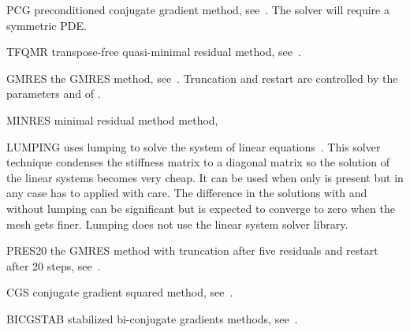 \begin{memberdesc}[SolverOptions]{PCG}
preconditioned conjugate gradient method, see~. The solver will require a symmetric PDE.
\end{memberdesc}

\begin{memberdesc}[SolverOptions]{TFQMR}
transpose-free quasi-minimal residual method, see~. \end{memberdesc}

\begin{memberdesc}[SolverOptions]{GMRES}
the GMRES method, see~. Truncation and restart are controlled by the parameters
 and  of .
\end{memberdesc}

\begin{memberdesc}[SolverOptions]{MINRES}
minimal residual method method,  \end{memberdesc}

\begin{memberdesc}[SolverOptions]{LUMPING}
uses lumping to solve the system of linear equations~. This solver technique
condenses the stiffness matrix to a diagonal matrix so the solution of the linear systems becomes very cheap. It can be used when
only  is present but in any case has to applied with care. The difference in the solutions with and without lumping can be significant
but is expected to converge to zero when the mesh gets finer.
Lumping does not use the linear system solver library.
\end{memberdesc}

\begin{memberdesc}[SolverOptions]{PRES20}
the GMRES method with truncation after five residuals and
restart after 20 steps, see~.
\end{memberdesc}

\begin{memberdesc}[SolverOptions]{CGS}
conjugate gradient squared method, see~.
\end{memberdesc}

\begin{memberdesc}[SolverOptions]{BICGSTAB}
stabilized bi-conjugate gradients methods, see~.
\end{memberdesc}

